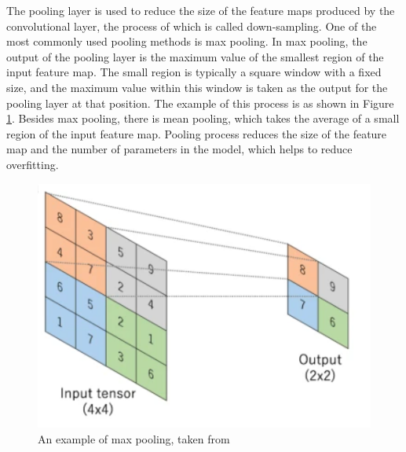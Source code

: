 The pooling layer is used to reduce the size of the feature maps produced by 
the convolutional layer, the process of which is called down-sampling. 
One of the most commonly used pooling methods is max pooling.
In max pooling, the output of the pooling layer is the maximum value of 
the smallest region of the input feature map. 
The small region is typically a square window with a fixed size, and the maximum
value within this window is taken as the output for the pooling layer at that position.
The example of this process is as shown in Figure \ref{max-pooling}.
Besides max pooling, there is mean pooling, which takes the average of 
a small region of the input feature map. 
Pooling process reduces the size of the feature map and the number of parameters 
in the model, which helps to reduce overfitting.
\vspace{1.2cm}
\begin{figure}[h]
  \centering
  \includegraphics[width=100truemm]{resources/2_background/max_pooling.png}
  \caption{
    An example of max pooling,
    taken from \cite{yamashita2018convolutional}
  }
  \label{max-pooling}
\end{figure}


